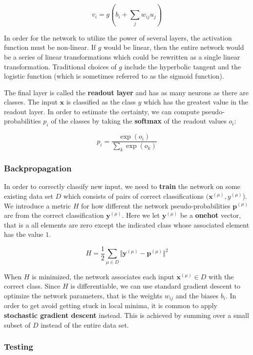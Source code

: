 \[
v_i = g\left( b_i + \sum_j w_{ij} u_j \right)
\]

In order for the network to utilize the power of several layers, the activation function must be non-linear. If $g$ would be linear, then the entire network would be a series of linear transformations which could be rewritten as a single linear transformation. Traditional choices of $g$ include the hyperbolic tangent and the logistic function (which is sometimes referred to as the sigmoid function).

The final layer is called the \textbf{readout layer} and has as many neurons as there are classes. The input $\mathbf{x}$ is classified as the class $y$ which has the greatest value in the readout layer. In order to estimate the certainty, we can compute pseudo-probabilities $p_i$ of the classes by taking the \textbf{softmax} of the readout values $o_i$:

\[
p_i = \frac{ \exp(o_i) }{ \sum_k \exp(o_k) }
\]

\subsubsection{Backpropagation}

In order to correctly classify new input, we need to \textbf{train} the network on some existing data set $D$ which consists of pairs of correct classifications $(\mathbf{x}^{(\mu)}, y^{(\mu)}$).
We introduce a metric $H$ for how different the network pseudo-probabilities $\mathbf{p}^{(\mu)}$ are from the correct classification $\mathbf{y}^{(\mu)}$. Here we let $\mathbf{y}^{(\mu)}$ be a \textbf{onehot} vector, that is a all elements are zero except the indicated class whose associated element has the value $1$.

\[
H = \frac{1}{2} \sum_{\mu \in D} \Vert
  \mathbf{y}^{(\mu)} - \mathbf{p}^{(\mu)}
\Vert ^2
\]

When $H$ is minimized, the network associates each input $\mathbf{x}^{(\mu)} \in D$ with the correct class. Since $H$ is differentiable, we can use standard gradient descent to optimize the network parameters, that is the weights $w_{ij}$ and the biases $b_i$. In order to get avoid getting stuck in local minima, it is common to apply \textbf{stochastic gradient descent} instead. This is achieved by summing over a small subset of $D$ instead of the entire data set.

\subsubsection{Testing}

